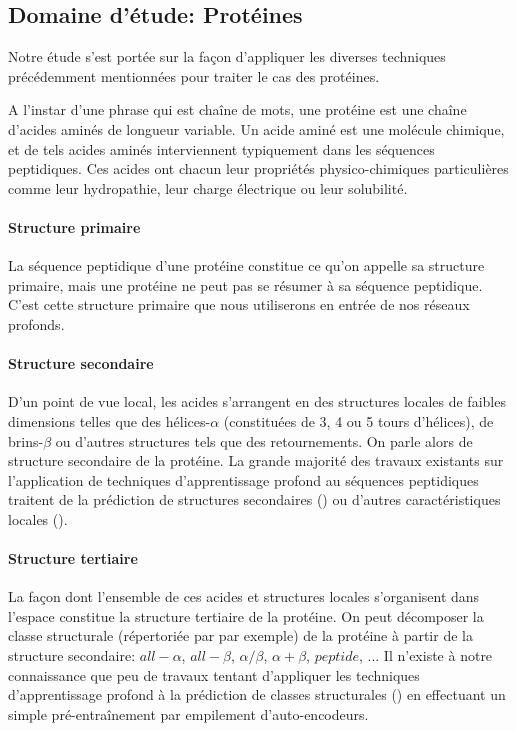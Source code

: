 \documentclass[a4paper, 11pt, onecolumn]{article}
\begin{document}
\subsection{Domaine d'étude: Protéines}

Notre étude s'est portée sur la façon d'appliquer les diverses techniques
précédemment mentionnées pour traiter le cas des protéines.

A l'instar d'une phrase qui est chaîne de mots, une protéine est une chaîne
d'acides aminés de longueur variable. Un acide aminé est une molécule chimique,
et de tels acides aminés interviennent typiquement dans les séquences
peptidiques. Ces acides ont chacun leur propriétés physico-chimiques
particulières comme leur hydropathie, leur charge électrique ou leur solubilité.

\paragraph{Structure primaire}

La séquence peptidique d'une protéine constitue ce qu'on appelle sa structure
primaire, mais une protéine ne peut pas se résumer à sa séquence peptidique.
C'est cette structure primaire que nous utiliserons en entrée de nos réseaux profonds.

\paragraph{Structure secondaire}

D'un point de vue local, les acides s'arrangent en des structures locales de
faibles dimensions telles que des hélices-$\alpha$ (constituées de 3, 4 ou 5 tours
d'hélices), de brins-$\beta$ ou d'autres structures tels que des retournements.
On parle alors de structure secondaire de la protéine. La grande majorité des
travaux existants sur l'application de techniques d'apprentissage profond au
séquences peptidiques traitent de la prédiction de structures secondaires
(\cite{Spencer:2015:DLN:2817095.2817106}) ou d'autres caractéristiques locales (\cite{qi2012unified}).

\paragraph{Structure tertiaire}

La façon dont l'ensemble de ces acides et structures locales s'organisent dans
l'espace constitue la structure tertiaire de la protéine. On peut décomposer la
classe structurale (répertoriée par \cite{fox2014scope} par exemple) de la protéine à partir de la structure secondaire:
$all-\alpha$, $all-\beta$, $\alpha /\beta$, $\alpha + \beta$,
$peptide$, ... Il n'existe à notre connaissance que peu de travaux tentant
d'appliquer les techniques d'apprentissage  profond à la prédiction de classes
structurales (\cite{jian2013predicting}) en effectuant un simple pré-entraînement par
empilement d'auto-encodeurs.
\end{document}
